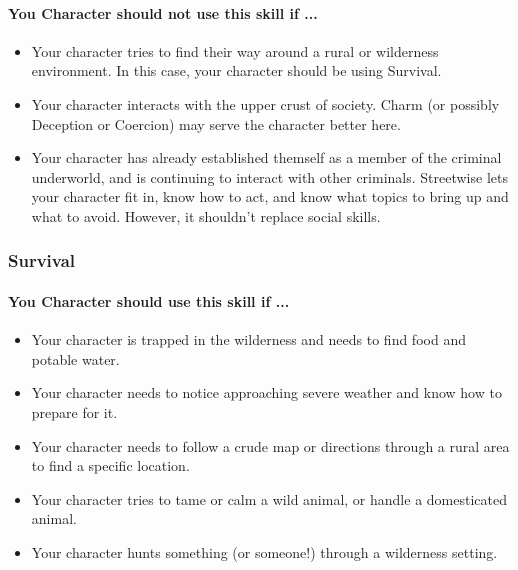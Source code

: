 \begin{multicols}{2}
\paragraph{You Character should not use this skill if ...}
\begin{itemize}
    \item Your character tries to find their way around a rural or wilderness
        environment. In this case, your character should be using Survival.
    \item Your character interacts with the upper crust of society. Charm (or
        possibly Deception or Coercion) may serve the character better here.
    \item Your character has already established themself as a member of the
        criminal underworld, and is continuing to interact with other criminals.
        Streetwise lets your character fit in, know how to act, and know what
        topics to bring up and what to avoid. However, it shouldn't replace
        social skills.
\end{itemize}

\subsubsection{Survival}\label{skill:survival}
\paragraph{You Character should use this skill if ...}
\begin{itemize}
    \item Your character is trapped in the wilderness and needs to find food and
        potable water.
    \item Your character needs to notice approaching severe weather and know how
        to prepare for it.
    \item Your character needs to follow a crude map or directions through a rural
        area to find a specific location.
    \item Your character tries to tame or calm a wild animal, or handle a
        domesticated animal.
    \item Your character hunts something (or someone!) through a wilderness
        setting.
\end{itemize}

\end{multicols}
